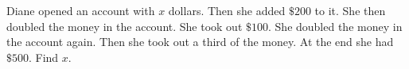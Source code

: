 Diane opened an account with $x$ dollars. Then she added $\$200$ to it. She then doubled the money in the account. She took out $\$100$. She doubled the money in the account again. Then she took out a third of the money. At the end she had $\$500$. Find $x$.
